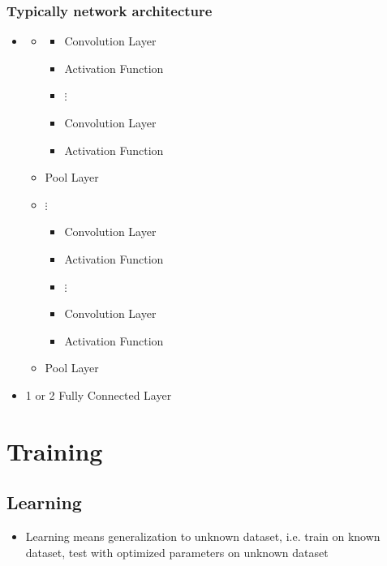 \documentclass[10pt,a4paper]{article}
\newcommand{\tab}[1][1]{\hspace*{#1cm}}
\begin{document}
\subsubsection{Typically network architecture}
\begin{itemize}
	\item[] \begin{itemize}
		\item[] \begin{itemize}
			\item Convolution Layer
			\item Activation Function
			\item[] \tab $\vdots$
			\item Convolution Layer
			\item Activation Function
		\end{itemize}
		\item Pool Layer
		\item[] \tab $\vdots$
		\begin{itemize}
			\item Convolution Layer
			\item Activation Function
			\item[] \tab $\vdots$
			\item Convolution Layer
			\item Activation Function
		\end{itemize}
		\item Pool Layer
	\end{itemize}
	\item 1 or 2 Fully Connected Layer
\end{itemize}

	






\pagebreak
\section{Training}
\subsection{Learning}
\begin{itemize}
	\item Learning means generalization to unknown dataset, i.e. train on known dataset, test with optimized parameters on unknown dataset
\end{itemize}
\end{document}
